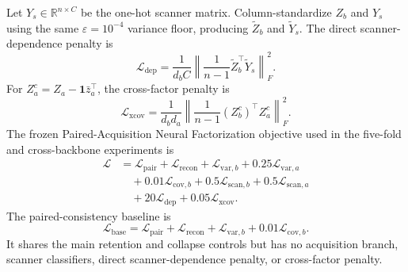Let $Y_s\in\mathbb{R}^{n\times C}$ be the one-hot scanner matrix. Column-standardize $Z_b$ and $Y_s$ using the same $\varepsilon=10^{-4}$ variance floor, producing $\widetilde Z_b$ and $\widetilde Y_s$. The direct scanner-dependence penalty is
\begin{equation}
 \mathcal{L}_{\mathrm{dep}}
 =\frac{1}{d_bC}
  \left\lVert
   \frac{1}{n-1}\widetilde Z_b^{\top}\widetilde Y_s
  \right\rVert_F^2.
\end{equation}
For $Z_a^c=Z_a-\mathbf{1}\bar z_a^{\top}$, the cross-factor penalty is
\begin{equation}
 \mathcal{L}_{\mathrm{xcov}}
 =\frac{1}{d_bd_a}
  \left\lVert
   \frac{1}{n-1}(Z_b^c)^{\top}Z_a^c
  \right\rVert_F^2.
\end{equation}
The frozen Paired-Acquisition Neural Factorization objective used in the five-fold and cross-backbone experiments is
\begin{align}
 \mathcal{L}
 &=\mathcal{L}_{\mathrm{pair}}
 +\mathcal{L}_{\mathrm{recon}}
 +\mathcal{L}_{\mathrm{var},b}
 +0.25\mathcal{L}_{\mathrm{var},a} \\
 &\quad
 +0.01\mathcal{L}_{\mathrm{cov},b}
 +0.5\mathcal{L}_{\mathrm{scan},b}
 +0.5\mathcal{L}_{\mathrm{scan},a} \\
 &\quad
 +20\mathcal{L}_{\mathrm{dep}}
 +0.05\mathcal{L}_{\mathrm{xcov}}.
\end{align}
The paired-consistency baseline is
\begin{equation}
 \mathcal{L}_{\mathrm{base}}
 =\mathcal{L}_{\mathrm{pair}}
 +\mathcal{L}_{\mathrm{recon}}
 +\mathcal{L}_{\mathrm{var},b}
 +0.01\mathcal{L}_{\mathrm{cov},b}.
\end{equation}
It shares the main retention and collapse controls but has no acquisition branch, scanner classifiers, direct scanner-dependence penalty, or cross-factor penalty.

